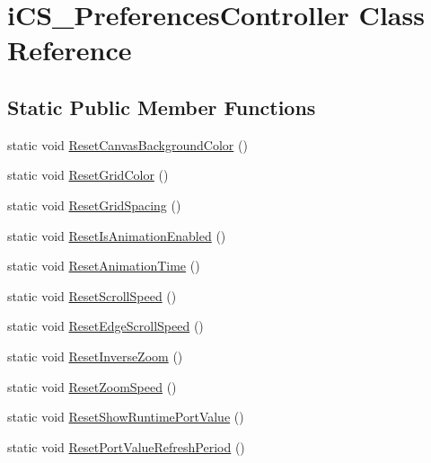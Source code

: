 \hypertarget{classi_c_s___preferences_controller}{\section{i\+C\+S\+\_\+\+Preferences\+Controller Class Reference}
\label{classi_c_s___preferences_controller}
}
\subsection*{Static Public Member Functions}
\begin{DoxyCompactItemize}
\item 
static void \hyperlink{classi_c_s___preferences_controller_a1674363628ef6af07d73dd7ed24ae482}{Reset\+Canvas\+Background\+Color} ()
\item 
static void \hyperlink{classi_c_s___preferences_controller_a386283862a8836e2fb66ecb58aba0f6f}{Reset\+Grid\+Color} ()
\item 
static void \hyperlink{classi_c_s___preferences_controller_a5fa54f57afd2a7fd6909d70e783b4cb5}{Reset\+Grid\+Spacing} ()
\item 
static void \hyperlink{classi_c_s___preferences_controller_a731686cd39c2f435924aa67ee523f3f2}{Reset\+Is\+Animation\+Enabled} ()
\item 
static void \hyperlink{classi_c_s___preferences_controller_a4e105d3664a0478f998ad5c8e7213b96}{Reset\+Animation\+Time} ()
\item 
static void \hyperlink{classi_c_s___preferences_controller_afb9428f0a0df335871cfd9dae9bed026}{Reset\+Scroll\+Speed} ()
\item 
static void \hyperlink{classi_c_s___preferences_controller_a67600741a4084ee03fbf000be3287e2b}{Reset\+Edge\+Scroll\+Speed} ()
\item 
static void \hyperlink{classi_c_s___preferences_controller_ac3e13f94475199ec07a07bcdfe03992d}{Reset\+Inverse\+Zoom} ()
\item 
static void \hyperlink{classi_c_s___preferences_controller_a9d6d907eb153c67a30b03d12d5e42e70}{Reset\+Zoom\+Speed} ()
\item 
static void \hyperlink{classi_c_s___preferences_controller_a66b143209085137c0666f2ffec9d8387}{Reset\+Show\+Runtime\+Port\+Value} ()
\item 
static void \hyperlink{classi_c_s___preferences_controller_a71a030f7c2b716c2858fd45976d61ef4}{Reset\+Port\+Value\+Refresh\+Period} ()
\item 

\end{DoxyCompactItemize}
